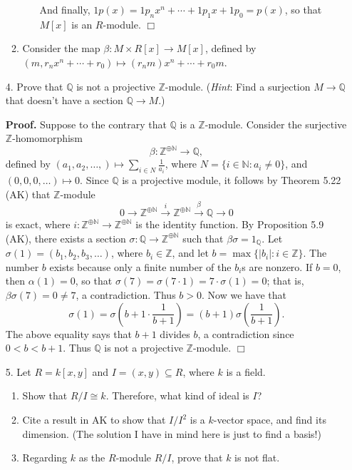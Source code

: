 \documentclass[9pt]{article}
\newcommand{\qed}{\hfill \ensuremath{\Box}}
\newcommand{\Z}{\mathbb{Z}}
\newcommand{\N}{\mathbb{N}}
\newcommand{\Q}{\mathbb{Q}}
\begin{document}
\begin{enumerate}
\begin{enumerate}
\begin{itemize}
                  And finally, $1p(x) = 1p_nx^n + \cdots + 1p_1x + 1p_0 = p(x)$,
                  so that $M[x]$ is an $R$-module. \qed
               \end{itemize}
         \item Consider the map $\beta : M \times R[x] \rightarrow M[x]$,
               defined by $(m, r_nx^n + \cdots + r_0) \mapsto (r_nm)x^n + \cdots
               + r_0m$.
      \end{enumerate}
   \item[4.]   Prove that $\Q$ is not a projective $\Z$-module. (\textit{Hint}:
               Find a surjection $M \rightarrow \Q$ that doesn't have a section
               $\Q \rightarrow M$.)
               
      \textbf{Proof.} Suppose to the contrary that $\Q$ is a $\Z$-module.
      Consider the surjective $\Z$-homomorphism
      $$\beta : \Z^{\oplus \N} \rightarrow \Q,$$
      defined by $(a_1, a_2, \ldots, ) \mapsto \sum_{i\in N}\frac{1}{a_i}$, where
      $N = \{i \in \N : a_i \neq 0\}$, and $(0, 0, 0, \ldots) \mapsto 0$. Since
      $\Q$ is a projective module, it follows by Theorem 5.22 (AK) that
      $\Z$-module 
      $$0 \rightarrow \Z^{\oplus \N} \stackrel{i}{\longrightarrow} \Z^{\oplus \N}
      \stackrel{\beta}{\longrightarrow}\Q \rightarrow 0$$
      is exact, where $i : \Z^{\oplus \N} \rightarrow \Z^{\oplus \N}$ is the
      identity function. By Proposition 5.9 (AK), there exists a section
      $\sigma : \Q \rightarrow \Z^{\oplus \N}$ such that $\beta\sigma = 1_\Q$.
      Let $\sigma(1) = (b_1, b_2, b_3, \ldots)$, where $b_i \in \Z$, and let
      $b = \max\{|b_i| : i \in \Z\}$. The number $b$ exists because only a
      finite number of the $b_i$s are nonzero. If $b = 0$, then $\alpha(1) = 0$,
      so that $\sigma(7) = \sigma(7 \cdot 1) = 7\cdot\sigma(1) = 0$; that is,
      $\beta\sigma(7) = 0 \neq 7$, a contradiction. Thus $b > 0$. Now we have
      that
      $$\sigma(1) = \sigma\left(b + 1 \cdot \frac{1}{b+1}\right) =
         (b+1)\sigma\left(\frac{1}{b+1}\right).$$
      The above equality says that $b + 1$ divides $b$, a contradiction since
      $0 < b < b + 1$. Thus $\Q$ is not a projective $\Z$-module. \qed
   \item[5.]   Let $R = k[x, y]$ and $I = (x, y) \subseteq R$, where $k$ is a
               field.
               \begin{enumerate}
                  \item Show that $R/I \cong k$. Therefore, what kind of ideal
                        is $I$?
                  \item Cite a result in AK to show that $I/I^2$ is a $k$-vector
                        space, and find its dimension. (The solution I have in
                        mind here is just to find a basis!)
                  \item Regarding $k$ as the $R$-module $R/I$, prove that $k$ is
                        not flat.
               \end{enumerate}


\end{enumerate}
\end{document}

